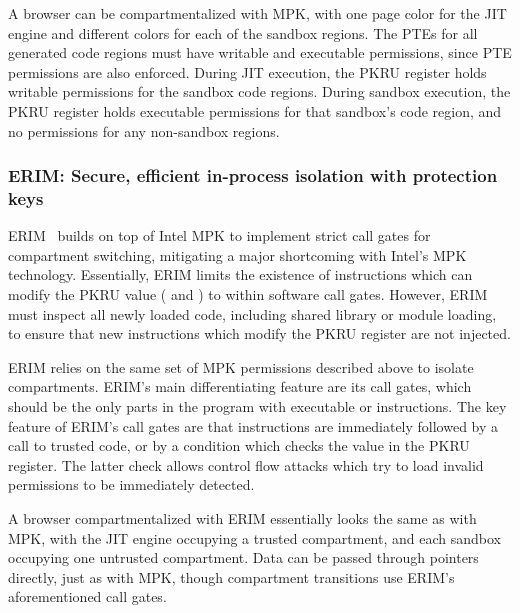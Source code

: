 A browser can be compartmentalized with MPK, with one page color for the JIT
engine and different colors for each of the sandbox regions.
The PTEs for all generated code regions must have writable and executable
permissions, since PTE permissions are also enforced.
During JIT execution, the PKRU register holds writable permissions for the
sandbox code regions.
During sandbox execution, the PKRU register holds executable permissions for 
that sandbox's code region, and no permissions for any non-sandbox regions.

\subsubsection{ERIM: Secure, efficient in-process isolation with protection keys}
ERIM~\cite{ERIMOberwagner19} builds on top of Intel MPK to implement 
strict call gates for compartment switching, mitigating a major
shortcoming with Intel's MPK technology.
Essentially, ERIM limits the existence of instructions which can
modify the PKRU value ( and ) to within
software call gates.
However, ERIM must inspect all newly loaded code, including shared
library or module loading, to ensure that new instructions which
modify the PKRU register are not injected.

ERIM relies on the same set of MPK permissions described above to
isolate compartments.
ERIM's main differentiating feature are its call gates, which should
be the only parts in the program with executable  or
 instructions.
The key feature of ERIM's call gates are that  instructions
are immediately followed by a call to trusted code, or by a condition which
checks the value in the PKRU register. 
The latter check allows control flow attacks which try to load invalid
permissions to be immediately detected.

A browser compartmentalized with ERIM essentially looks the same as with
MPK, with the JIT engine occupying a trusted compartment, and each sandbox
occupying one untrusted compartment. 
Data can be passed through pointers directly, just as with MPK, though 
compartment transitions use ERIM's aforementioned call gates.

